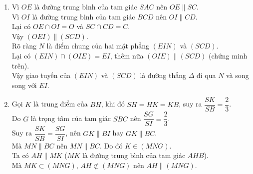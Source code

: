 \begin{bt}
{\begin{enumerate}
\begin{center}
\begin{tikzpicture}
   \end{tikzpicture}
   \end{center}
   \item Vì $OE$ là đường trung bình của tam giác $SAC$ nên $OE \parallel SC$.\\
   Vì $OI$ là đường trung bình của tam giác $BCD$ nên $OI \parallel CD$.\\
   Lại có $OE \cap OI =O$ và $SC \cap CD = C$.\\
   Vậy $(OEI)\parallel (SCD)$.\\
   Rõ ràng $N$ là điểm chung của hai mặt phẳng $(EIN)$ và $(SCD)$.\\
   Lại có $(EIN) \cap (OIE)=EI$, thêm nữa $(OIE)\parallel (SCD)$ (chứng minh trên).\\
   Vậy giao tuyến của $(EIN)$ và $(SCD)$ là đường thẳng $\Delta$ đi qua  $N$ và song song với $EI$.
   \item Gọi $K$ là trung điểm của $BH$, khi đó $SH=HK=KB$, suy ra $\dfrac{SK}{SB}=\dfrac{2}{3}$.\\
   Do $G$ là trọng tâm của tam giác $SBC$ nên $\dfrac{SG}{SI}=\dfrac{2}{3}$.\\
   Suy ra $\dfrac{SK}{SB}=\dfrac{SG}{SI}$, nên $GK\parallel BI$ hay $GK \parallel BC$.\\
   Mà $MN\parallel BC$ nên $MN \parallel BC$. Do đó $K\in (MNG)$.\\
   Ta có $AH\parallel MK$ ($MK$ là đường trung bình của tam giác $AHB$).\\
   Mà $MK \subset (MNG)$, $AH \not\subset (MNG)$ nên $AH \parallel (MNG)$.
  \end{enumerate}
  
  }
\end{bt}


